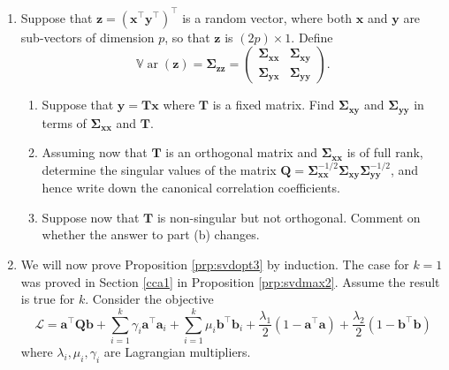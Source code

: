 \documentclass[
]{book}
\providecommand{\tightlist}{%
  \setlength{\itemsep}{0pt}\setlength{\parskip}{0pt}}
\theoremstyle{definition}
\theoremstyle{definition}
\theoremstyle{definition}
\theoremstyle{definition}
\theoremstyle{remark}
\begin{document}
\begin{enumerate}
\def\labelenumi{\arabic{enumi}.}
\setcounter{enumi}{2}
\tightlist
\item
  Suppose that \(\mathbf z= (\mathbf x^\top \mathbf y^\top)^\top\) is a random vector, where both \(\mathbf x\) and \(\mathbf y\) are sub-vectors of dimension \(p\), so that \(\mathbf z\) is \((2p)\times 1\). Define
  \[{\mathbb{V}\operatorname{ar}}(\mathbf z)=\boldsymbol{\Sigma}_{\mathbf z\mathbf z}=\begin{pmatrix} \boldsymbol{\Sigma}_{\mathbf x\mathbf x} & \boldsymbol{\Sigma}_{\mathbf x\mathbf y}\\\boldsymbol{\Sigma}_{\mathbf y\mathbf x} & \boldsymbol{\Sigma}_{\mathbf y\mathbf y}  \end{pmatrix}.\]

  \begin{enumerate}
  \def\labelenumii{\roman{enumii}.}
  \tightlist
  \item
    Suppose that \(\mathbf y= \mathbf T\mathbf x\) where \(\mathbf T\) is a fixed matrix. Find \(\boldsymbol{\Sigma}_{\mathbf x\mathbf y}\) and \(\boldsymbol{\Sigma}_{\mathbf y\mathbf y}\) in terms of \(\boldsymbol{\Sigma}_{\mathbf x\mathbf x}\) and \(\mathbf T\).
  \item
    Assuming now that \(\mathbf T\) is an orthogonal matrix and \(\boldsymbol{\Sigma}_{\mathbf x\mathbf x}\) is of full rank, determine the singular values of the matrix \(\mathbf Q=\boldsymbol{\Sigma}_{\mathbf x\mathbf x}^{-1/2}\boldsymbol{\Sigma}_ {\mathbf x\mathbf y}\boldsymbol{\Sigma}_{\mathbf y\mathbf y}^{-1/2}\), and hence write down the canonical correlation coefficients.
  \item
    Suppose now that \(\mathbf T\) is non-singular but not orthogonal. Comment on whether the answer to part (b) changes.
  \end{enumerate}
\item
  We will now prove Proposition \ref{prp:svdopt3} by induction.
  The case for \(k=1\) was proved in Section \ref{cca1} in Proposition \ref{prp:svdmax2}. Assume the result is true for \(k\). Consider the objective
  \[\mathcal{L} = \mathbf a^\top \mathbf Q\mathbf b+ \sum_{i=1}^k \gamma_i\mathbf a^\top \mathbf a_i + \sum_{i=1}^k \mu_i\mathbf b^\top \mathbf b_i + \frac{\lambda_1}{2}(1-\mathbf a^\top\mathbf a)+ \frac{\lambda_2}{2}(1-\mathbf b^\top\mathbf b)\]
  where \(\lambda_i, \mu_i, \gamma_i\) are Lagrangian multipliers.


\end{enumerate}
\end{document}
